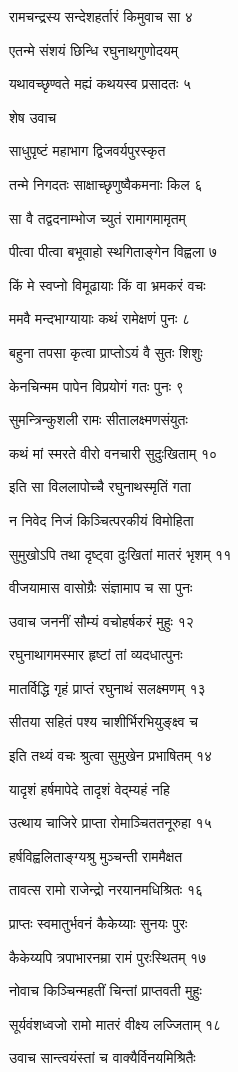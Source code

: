 रामचन्द्रस्य सन्देशहर्तारं किमुवाच सा ४

एतन्मे संशयं छिन्धि रघुनाथगुणोदयम्

यथावच्छृण्वते मह्यं कथयस्व प्रसादतः ५

शेष उवाच

साधुपृष्टं महाभाग द्विजवर्यपुरस्कृत

तन्मे निगदतः साक्षाच्छृणुष्वैकमनाः किल ६

सा वै तद्वदनाम्भोज च्युतं रामागमामृतम्

पीत्वा पीत्वा बभूवाहो स्थगिताङ्गेन विह्वला ७

किं मे स्वप्नो विमूढायाः किं वा भ्रमकरं वचः

ममवै मन्दभाग्यायाः कथं रामेक्षणं पुनः ८

बहुना तपसा कृत्वा प्राप्तोऽयं वै सुतः शिशुः

केनचिन्मम पापेन विप्रयोगं गतः पुनः ९

सुमन्त्रिन्कुशली रामः सीतालक्ष्मणसंयुतः

कथं मां स्मरते वीरो वनचारी सुदुःखिताम् १०

इति सा विललापोच्चै रघुनाथस्मृतिं गता

न निवेद निजं किञ्चित्परकीयं विमोहिता

सुमुखोऽपि तथा दृष्ट्वा दुःखितां मातरं भृशम् ११

वीजयामास वासोग्रैः संज्ञामाप च सा पुनः

उवाच जननीं सौम्यं वचोहर्षकरं मुहुः १२

रघुनाथागमस्मार हृष्टां तां व्यदधात्पुनः

मातर्विद्धि गृहं प्राप्तं रघुनाथं सलक्ष्मणम् १३

सीतया सहितं पश्य चाशीर्भिरभियुङ्क्ष्व च

इति तथ्यं वचः श्रुत्वा सुमुखेन प्रभाषितम् १४

यादृशं हर्षमापेदे तादृशं वेद्म्यहं नहि

उत्थाय चाजिरे प्राप्ता रोमाञ्चिततनूरुहा १५

हर्षविह्वलिताङ्ग्यश्रु मुञ्चन्ती राममैक्षत

तावत्स रामो राजेन्द्रो नरयानमधिश्रितः १६

प्राप्तः स्वमातुर्भवनं कैकेय्याः सुनयः पुरः

कैकेय्यपि त्रपाभारनम्रा रामं पुरःस्थितम् १७

नोवाच किञ्चिन्महतीं चिन्तां प्राप्तवती मुहुः

सूर्यवंशध्वजो रामो मातरं वीक्ष्य लज्जिताम् १८

उवाच सान्त्वयंस्तां च वाक्यैर्विनयमिश्रितैः

